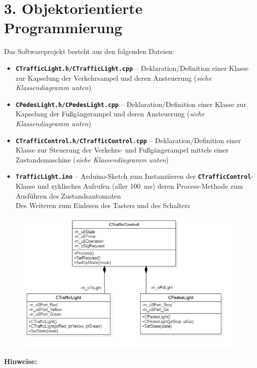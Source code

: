 \documentclass[
    fontsize=12pt,                      %
    paper=a4,                           %
    twoside=off,                       %
    DIV=15,                             %
    BCOR=12mm,                          %
    headings=normal,                    %
    headsepline=false,                   %
    footsepline=false,                  %
    headinclude=true,                   %
    footinclude=false,                  %
    toc=listof,                         %
    toc=bib,                            %
    chapterprefix=false,                %
    appendixprefix=false,               %
    numbers=noendperiod,                %
    captions=tableabove,                %
    footnotes=multiple,                 %
    bibliography=oldstyle,              %
    draft=false,                        %
]{scrreprt}
\newcommand{\Farbcode}[1]{\texttt{\textbf{\textcolor{myred}{#1}}}}
\begin{document}
\section*{3. Objektorientierte Programmierung}
Das Softwareprojekt besteht aus den folgenden Dateien:
\begin{itemize}
	\item \Farbcode{CTrafficLight.h/CTrafficLight.cpp} -- Deklaration/Definition einer Klasse zur Kapselung der Verkehrsampel und deren Ansteuerung (\emph{siehe Klassendiagramm unten})
	\item \Farbcode{CPedesLight.h/CPedesLight.cpp} -- Deklaration/Definition einer Klasse zur Kapselung der Fußgängerampel und deren Ansteuerung (\emph{siehe Klassendiagramm unten})
	\item \Farbcode{CTrafficControl.h/CTrafficControl.cpp} -- Deklaration/Definition einer Klasse zur Steuerung der Verkehrs- und Fußgängerampel mittels einer Zustandsmaschine (\emph{siehe Klassendiagramm unten})
	\item \Farbcode{TrafficLight.ino} -- Arduino-Sketch zum Instanziieren der \Farbcode{CTrafficControl}-Klasse und zyklisches Aufrufen (aller 100~ms) deren Process-Methode zum Ausführen des Zustandsautomaten \\
	Des Weiteren zum Einlesen des Tasters und des Schalters
	
\end{itemize}
\begin{figure}[H]
	\centering
	\includegraphics[width=\textwidth]{Figures/Klassendiagramm}
\end{figure}
\noindent
\textbf{Hinweise:}
\end{document}
